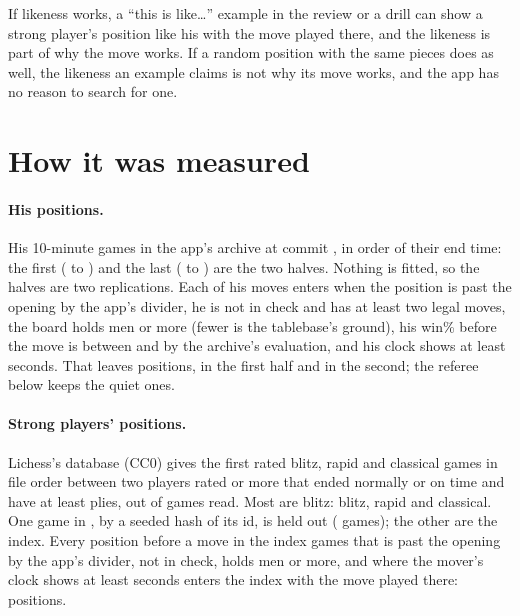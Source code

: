 \documentclass[11pt]{article}
\begin{document}
If likeness works, a ``this is like\ldots'' example in the review or a drill can show a strong
player's position like his with the move played there, and the likeness is part of why the move
works. If a random position with the same pieces does as well, the likeness an example claims is
not why its move works, and the app has no reason to search for one.

\section{How it was measured}

\paragraph{His positions.} His \Games{} 10-minute games in the app's archive at commit
\texttt{\AppCommit}, in order of their end time: the first \GamesFirst{} (\FirstFrom{} to
\FirstTo) and the last \GamesSecond{} (\SecondFrom{} to \SecondTo) are the two halves. Nothing is
fitted, so the halves are two replications. Each of his moves enters when the position is past
the opening by the app's divider, he is not in check and has at least two legal moves, the board
holds \MinMen{} men or more (fewer is the tablebase's ground), his win\% before the move is
between \WinLow{} and \WinHigh{} by the archive's evaluation, and his clock shows at least
\ClockFloor{} seconds. That leaves \Candidates{} positions, \CandFirst{} in the first half and
\CandSecond{} in the second; the referee below keeps the quiet ones.

\paragraph{Strong players' positions.} Lichess's \MonthName{} database (CC0) gives the first
\Cap{} rated blitz, rapid and classical games in file order between two players rated \Floor{} or
more that ended normally or on time and have at least \MinPlies{} plies, out of \GamesRead{}
games read. Most are blitz: \Blitz{} blitz, \Rapid{} rapid and \Classical{} classical. One game in
\HeldOutOneIn, by a seeded hash of its id, is held out (\HeldOutGames{} games); the other
\IndexGames{} are the index. Every position before a move in the index games that is past the
opening by the app's divider, not in check, holds \MinMen{} men or more, and where the mover's
clock shows at least \ClockFloor{} seconds enters the index with the move played there:
\IndexPositions{} positions.
\end{document}
